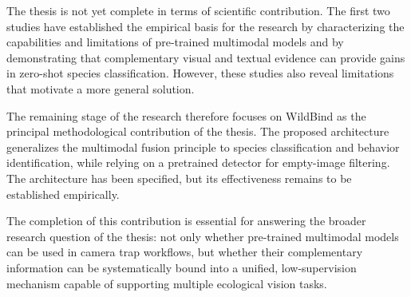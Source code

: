 The thesis is not yet complete in terms of scientific contribution. The first two studies have established the empirical basis for the research by characterizing the capabilities and limitations of pre-trained multimodal models and by demonstrating that complementary visual and textual evidence can provide gains in zero-shot species classification. However, these studies also reveal limitations that motivate a more general solution.

The remaining stage of the research therefore focuses on WildBind as the principal methodological contribution of the thesis. The proposed architecture generalizes the multimodal fusion principle to species classification and behavior identification, while relying on a pretrained detector for empty-image filtering. The architecture has been specified, but its effectiveness remains to be established empirically.

The completion of this contribution is essential for answering the broader research question of the thesis: not only whether pre-trained multimodal models can be used in camera trap workflows, but whether their complementary information can be systematically bound into a unified, low-supervision mechanism capable of supporting multiple ecological vision tasks.

